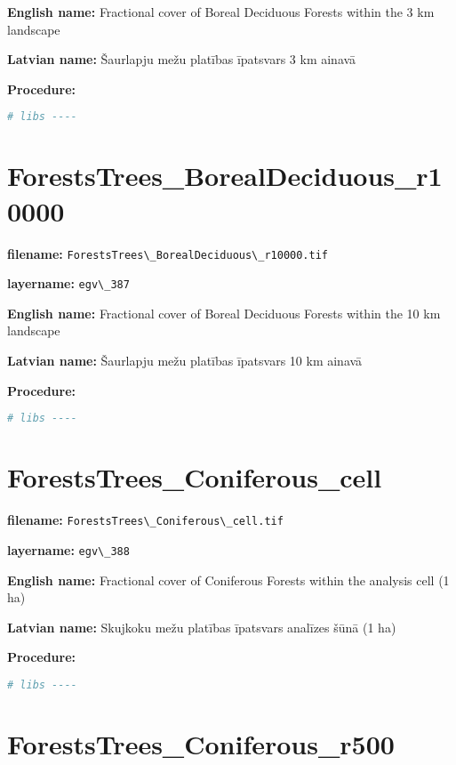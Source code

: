 \documentclass[
]{book}
\newcommand{\passthrough}[1]{#1}
\begin{document}
\textbf{English name:} Fractional cover of Boreal Deciduous Forests within the 3 km landscape

\textbf{Latvian name:} Šaurlapju mežu platības īpatsvars 3 km ainavā

\textbf{Procedure:}

\begin{lstlisting}[language=R]
# libs ----
\end{lstlisting}

\section{ForestsTrees\_BorealDeciduous\_r10000}\label{ch06.387}

\textbf{filename:} \passthrough{\lstinline!ForestsTrees\_BorealDeciduous\_r10000.tif!}

\textbf{layername:} \passthrough{\lstinline!egv\_387!}

\textbf{English name:} Fractional cover of Boreal Deciduous Forests within the 10 km landscape

\textbf{Latvian name:} Šaurlapju mežu platības īpatsvars 10 km ainavā

\textbf{Procedure:}

\begin{lstlisting}[language=R]
# libs ----
\end{lstlisting}

\section{ForestsTrees\_Coniferous\_cell}\label{ch06.388}

\textbf{filename:} \passthrough{\lstinline!ForestsTrees\_Coniferous\_cell.tif!}

\textbf{layername:} \passthrough{\lstinline!egv\_388!}

\textbf{English name:} Fractional cover of Coniferous Forests within the analysis cell (1 ha)

\textbf{Latvian name:} Skujkoku mežu platības īpatsvars analīzes šūnā (1 ha)

\textbf{Procedure:}

\begin{lstlisting}[language=R]
# libs ----
\end{lstlisting}

\section{ForestsTrees\_Coniferous\_r500}\label{ch06.389}
\end{document}
